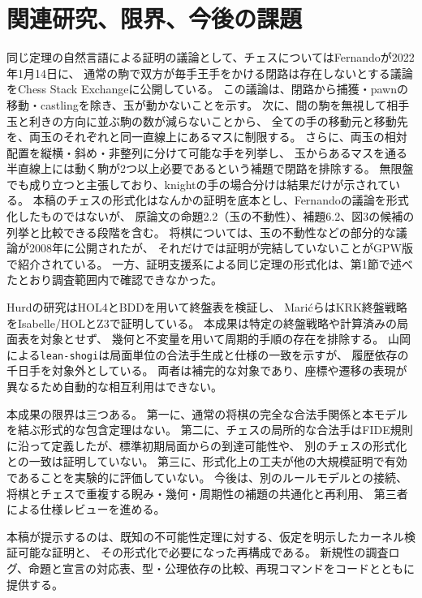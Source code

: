 \documentclass[a4paper,11pt]{article}
\newcommand{\code}[1]{{\small\nolinkurl{#1}}}
\theoremstyle{definition}
\begin{document}
\section{関連研究、限界、今後の課題}\label{sec:related}
同じ定理の自然言語による証明の議論として、チェスについてはFernandoが2022年1月14日に、
通常の駒で双方が毎手王手をかける閉路は存在しないとする議論をChess Stack Exchangeに公開している\cite{fernando}。
この議論は、閉路から捕獲・pawnの移動・castlingを除き、玉が動かないことを示す。
次に、間の駒を無視して相手玉と利きの方向に並ぶ駒の数が減らないことから、
全ての手の移動元と移動先を、両玉のそれぞれと同一直線上にあるマスに制限する。
さらに、両玉の相対配置を縦横・斜め・非整列に分けて可能な手を列挙し、
玉からあるマスを通る半直線上には動く駒が2つ以上必要であるという補題で閉路を排除する。
無限盤でも成り立つと主張しており、knightの手の場合分けは結果だけが示されている。
本稿のチェスの形式化はなんかの証明を底本とし、Fernandoの議論を形式化したものではないが、
原論文の命題2.2（玉の不動性）、補題6.2、図3の候補の列挙と比較できる段階を含む。
将棋については、玉の不動性などの部分的な議論が2008年に公開されたが、
それだけでは証明が完結していないことがGPW版で紹介されている\cite{gpw}。
一方、証明支援系による同じ定理の形式化は、第1節で述べたとおり調査範囲内で確認できなかった。

Hurdの研究はHOL4とBDDを用いて終盤表を検証し\cite{hurd}、
MarićらはKRK終盤戦略をIsabelle/HOLとZ3で証明している\cite{krk}。
本成果は特定の終盤戦略や計算済みの局面表を対象とせず、
幾何と不変量を用いて周期的手順の存在を排除する。
山岡による\code{lean-shogi}は局面単位の合法手生成と仕様の一致を示すが、
履歴依存の千日手を対象外としている\cite{yam}。
両者は補完的な対象であり、座標や遷移の表現が異なるため自動的な相互利用はできない。

本成果の限界は三つある。
第一に、通常の将棋の完全な合法手関係と本モデルを結ぶ形式的な包含定理はない。
第二に、チェスの局所的な合法手はFIDE規則に沿って定義したが、標準初期局面からの到達可能性や、
別のチェスの形式化との一致は証明していない。
第三に、形式化上の工夫が他の大規模証明で有効であることを実験的に評価していない。
今後は、別のルールモデルとの接続、将棋とチェスで重複する睨み・幾何・周期性の補題の共通化と再利用、
第三者による仕様レビューを進める。

本稿が提示するのは、既知の不可能性定理に対する、仮定を明示したカーネル検証可能な証明と、
その形式化で必要になった再構成である。
新規性の調査ログ、命題と宣言の対応表、型・公理依存の比較、再現コマンドをコードとともに提供する。
\end{document}
